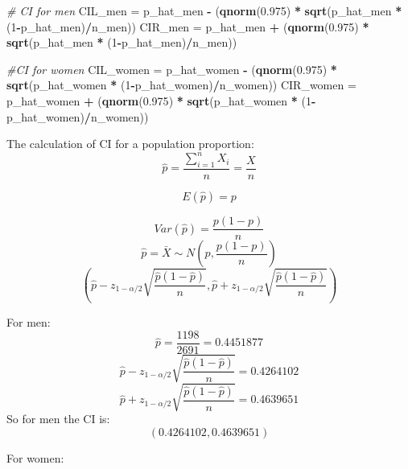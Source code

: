 \documentclass[]{article}
\newenvironment{Shaded}{\begin{snugshade}}{\end{snugshade}}
\newcommand{\KeywordTok}[1]{\textcolor[rgb]{0.13,0.29,0.53}{\textbf{#1}}}
\newcommand{\DecValTok}[1]{\textcolor[rgb]{0.00,0.00,0.81}{#1}}
\newcommand{\FloatTok}[1]{\textcolor[rgb]{0.00,0.00,0.81}{#1}}
\newcommand{\StringTok}[1]{\textcolor[rgb]{0.31,0.60,0.02}{#1}}
\newcommand{\CommentTok}[1]{\textcolor[rgb]{0.56,0.35,0.01}{\textit{#1}}}
\newcommand{\OperatorTok}[1]{\textcolor[rgb]{0.81,0.36,0.00}{\textbf{#1}}}
\newcommand{\NormalTok}[1]{#1}
\begin{document}
\begin{Shaded}
\begin{Highlighting}[]
\CommentTok{# CI for men}
\NormalTok{CIL_men =}\StringTok{ }\NormalTok{p_hat_men }\OperatorTok{-}\StringTok{ }\NormalTok{(}\KeywordTok{qnorm}\NormalTok{(}\FloatTok{0.975}\NormalTok{) }\OperatorTok{*}\StringTok{ }\KeywordTok{sqrt}\NormalTok{(p_hat_men }\OperatorTok{*}\StringTok{ }\NormalTok{(}\DecValTok{1}\OperatorTok{-}\NormalTok{p_hat_men)}\OperatorTok{/}\NormalTok{n_men))}
\NormalTok{CIR_men =}\StringTok{ }\NormalTok{p_hat_men }\OperatorTok{+}\StringTok{ }\NormalTok{(}\KeywordTok{qnorm}\NormalTok{(}\FloatTok{0.975}\NormalTok{) }\OperatorTok{*}\StringTok{ }\KeywordTok{sqrt}\NormalTok{(p_hat_men }\OperatorTok{*}\StringTok{ }\NormalTok{(}\DecValTok{1}\OperatorTok{-}\NormalTok{p_hat_men)}\OperatorTok{/}\NormalTok{n_men))}

\CommentTok{#CI for women}
\NormalTok{CIL_women =}\StringTok{ }\NormalTok{p_hat_women }\OperatorTok{-}\StringTok{ }\NormalTok{(}\KeywordTok{qnorm}\NormalTok{(}\FloatTok{0.975}\NormalTok{) }\OperatorTok{*}\StringTok{ }\KeywordTok{sqrt}\NormalTok{(p_hat_women }\OperatorTok{*}\StringTok{ }\NormalTok{(}\DecValTok{1}\OperatorTok{-}\NormalTok{p_hat_women)}\OperatorTok{/}\NormalTok{n_women))}
\NormalTok{CIR_women =}\StringTok{ }\NormalTok{p_hat_women }\OperatorTok{+}\StringTok{ }\NormalTok{(}\KeywordTok{qnorm}\NormalTok{(}\FloatTok{0.975}\NormalTok{) }\OperatorTok{*}\StringTok{ }\KeywordTok{sqrt}\NormalTok{(p_hat_women }\OperatorTok{*}\StringTok{ }\NormalTok{(}\DecValTok{1}\OperatorTok{-}\NormalTok{p_hat_women)}\OperatorTok{/}\NormalTok{n_women))}
\end{Highlighting}
\end{Shaded}

The calculation of CI for a population proportion: \[
\hat{p}=\frac{\sum_{i=1}^{n}X_{i}}{n}=\frac{X}{n}
\]

\[
E(\hat{p}) = p
\]

\[
Var(\hat{p}) = \frac{p(1-p)}{n}
\] \[
\hat{p} = \bar{X} \sim N(p,\frac{p(1-p)}{n})
\] \[
(\hat{p} - z_{1-\alpha/2}\sqrt{\frac{\hat{p}(1-\hat{p})}{n}},\hat{p} + z_{1-\alpha/2}\sqrt{\frac{\hat{p}(1-\hat{p})}{n}})
\]

For men: \[
\hat{p}=\frac{1198}{2691}=0.4451877
\] \[
\hat{p} - z_{1-\alpha/2}\sqrt{\frac{\hat{p}(1-\hat{p})}{n}}=0.4264102
\] \[
\hat{p} + z_{1-\alpha/2}\sqrt{\frac{\hat{p}(1-\hat{p})}{n}}=0.4639651
\] So for men the CI is: \[
(0.4264102,0.4639651)
\]

For women:
\end{document}
